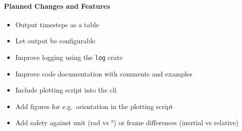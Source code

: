\paragraph{Planned Changes and Features}\label{planned-changes-and-features}

\begin{itemize}
  \item Output timesteps as a table
  \item Let output be configurable
  \item Improve logging using the \lstinline{log} crate
  \item Improve code documentation with comments and examples
  \item Include plotting script into the \gls{cli}
  \item Add figures for e.g.~orientation in the plotting script
  \item Add safety against unit (rad vs °) or frame differences (inertial vs
        relative)
\end{itemize}
